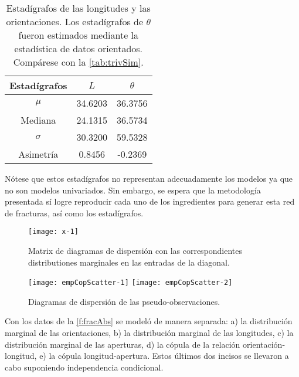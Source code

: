 \begin{table}[htpb]
\begin{center}
	\begin{tabular}{|c|c|c|} %
		\hline %
		\textbf{Estad\'igrafos} & \textbf{$L$} & \textbf{$\theta$} \\
		\hline\hline
		$\mu$    & 34.6203 & 36.3756 \\
		Mediana   & 24.1315 & 36.5734 \\
		$\sigma$ & 30.3200 & 59.5328 \\
		Asimetr\'ia & 0.8456  & -0.2369 \\ \hline
	\end{tabular}
\end{center}
    \caption{Estad\'igrafos de las longitudes y las orientaciones. Los estad\'igrafos de $\theta$ fueron estimados mediante la estad\'istica de datos orientados. Comp\'arese con la \autoref{tab:trivSim}.}
    \label{tab:triv}
\end{table}

N\'otese que estos estad\'igrafos no representan adecuadamente los modelos ya que no son modelos univariados. Sin embargo, se espera que la metodolog\'ia presentada s\'i logre reproducir cada uno de los ingredientes para generar esta red de fracturas, as\'i como los estad\'igrafos.

\begin{figure}
	\centering
	\texttt{[image: x-1]}
	\caption{Matrix de diagramas de dispersi\'on con las correspondientes distributiones marginales en las entradas de la diagonal.}
\end{figure}

\begin{figure}
	\centering
	\texttt{[image: empCopScatter-1]}
	\texttt{[image: empCopScatter-2]}
	\caption{Diagramas de dispersi\'on de las pseudo-observaciones.}
	\label{f:psdObs} %
\end{figure}

Con los datos de la \autoref{f:fracAbs} se model\'o de manera separada: a) la distribuci\'on marginal de las orientaciones, b) la distribuci\'on marginal de las longitudes, c) la distribuci\'on marginal de las aperturas, d) la c\'opula de la relaci\'on orientaci\'on-longitud, e) la c\'opula longitud-apertura.
Estos \'ultimos dos incisos se llevaron a cabo suponiendo independencia condicional.

